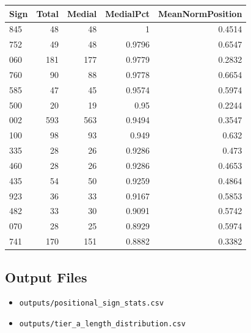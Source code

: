 ﻿\documentclass[11pt,a4paper]{article}
\begin{document}
\begin{center}
\begin{tabular}{lrrrr}
\toprule
\textbf{Sign} & \textbf{Total} & \textbf{Medial} & \textbf{MedialPct} & \textbf{MeanNormPosition} \\
\midrule
845 & 48 & 48 & 1 & 0.4514 \\
752 & 49 & 48 & 0.9796 & 0.6547 \\
060 & 181 & 177 & 0.9779 & 0.2832 \\
760 & 90 & 88 & 0.9778 & 0.6654 \\
585 & 47 & 45 & 0.9574 & 0.5974 \\
500 & 20 & 19 & 0.95 & 0.2244 \\
002 & 593 & 563 & 0.9494 & 0.3547 \\
100 & 98 & 93 & 0.949 & 0.632 \\
335 & 28 & 26 & 0.9286 & 0.473 \\
460 & 28 & 26 & 0.9286 & 0.4653 \\
435 & 54 & 50 & 0.9259 & 0.4864 \\
923 & 36 & 33 & 0.9167 & 0.5853 \\
482 & 33 & 30 & 0.9091 & 0.5742 \\
070 & 28 & 25 & 0.8929 & 0.5974 \\
741 & 170 & 151 & 0.8882 & 0.3382 \\
\bottomrule
\end{tabular}
\end{center}

\subsection*{Output Files}

\begin{itemize}
\item \texttt{outputs/positional\_sign\_stats.csv}
\item \texttt{outputs/tier\_a\_length\_distribution.csv}
\end{itemize}
\end{document}
